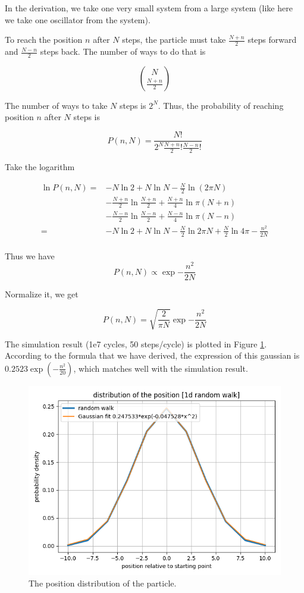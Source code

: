 \documentclass{assignmeownt}
\begin{document}
In the derivation, we take one very small system from a large system (like here we take one oscillator from the system).

To reach the position $n$ after $N$ steps, the particle must take $\frac{N+n}{2}$ steps forward and $\frac{N-n}{2}$ steps back. The number of ways to do that is

$${N \choose \frac{N+n}{2}}$$

The number of ways to take $N$ steps is $2^N$. Thus, the probability of reaching position $n$ after $N$ steps is

$$P(n, N) = \frac{N!}{2^N \frac{N+n}{2}!\frac{N-n}{2}!}$$

Take the logarithm

\begin{align*}
\ln P(n, N) = &-N\ln 2+N\ln N-\frac{N}{2}\ln(2\pi N) \\
&-\frac{N+n}{2}\ln\frac{N+n}{2}+\frac{N+n}{4}\ln\pi (N+n) \\
&-\frac{N-n}{2}\ln\frac{N-n}{2}+\frac{N-n}{4}\ln\pi (N-n) \\
=&-N\ln 2+N\ln N -\frac{N}{2}\ln 2\pi N+\frac{N}{2}\ln{4\pi}-\frac{n^2}{2N}\\
\end{align*}

Thus we have
$$ P(n, N) \propto \exp{-\frac{n^2}{2N}} $$

Normalize it, we get

$$P(n, N) = \sqrt{\frac{2}{\pi N}}\exp{-\frac{n^2}{2N}}$$

The simulation result (1e7 cycles, 50 steps/cycle) is plotted in Figure \ref{fig:gaussian_comparison}. According to the formula that we have derived, the expression of this gaussian is $0.2523\exp{(-\frac{n^2}{20})}$, which matches well with the simulation result.
\begin{figure}
  \centering
  \includegraphics[width=0.5\linewidth]{../block1/4-RandomWalk1D/Results/Figure_1.png}
  \caption{The position distribution of the particle.}
  \label{fig:gaussian_comparison}
\end{figure}
\end{document}
